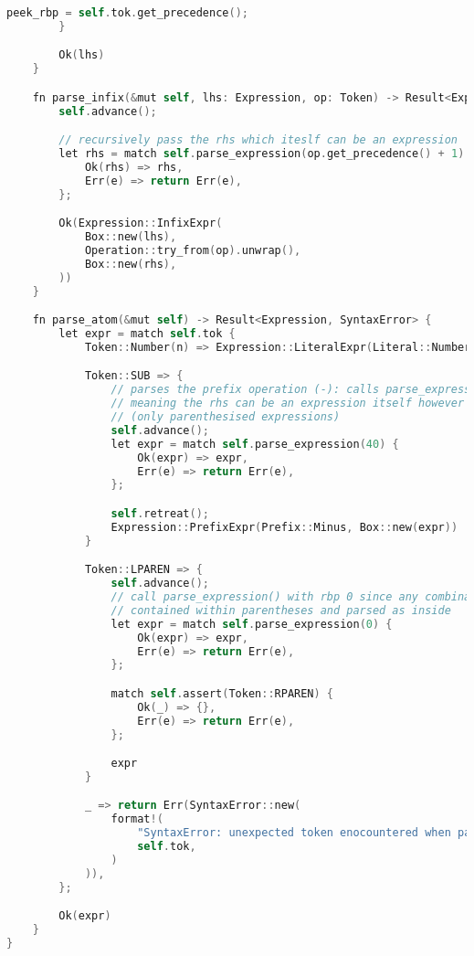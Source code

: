 \begin{lstlisting}[language=C]
            peek_rbp = self.tok.get_precedence();
        }

        Ok(lhs)
    }

    fn parse_infix(&mut self, lhs: Expression, op: Token) -> Result<Expression, SyntaxError> {
        self.advance();

        // recursively pass the rhs which iteslf can be an expression 
        let rhs = match self.parse_expression(op.get_precedence() + 1) {
            Ok(rhs) => rhs,
            Err(e) => return Err(e),
        };

        Ok(Expression::InfixExpr(
            Box::new(lhs),
            Operation::try_from(op).unwrap(),
            Box::new(rhs),
        ))
    }

    fn parse_atom(&mut self) -> Result<Expression, SyntaxError> {
        let expr = match self.tok {
            Token::Number(n) => Expression::LiteralExpr(Literal::Number(n as i32)),

            Token::SUB => {
                // parses the prefix operation (-): calls parse_expression() with rbp 40
                // meaning the rhs can be an expression itself however only one with precedence > 40
                // (only parenthesised expressions)
                self.advance();
                let expr = match self.parse_expression(40) {
                    Ok(expr) => expr,
                    Err(e) => return Err(e),
                };

                self.retreat();
                Expression::PrefixExpr(Prefix::Minus, Box::new(expr))
            }

            Token::LPAREN => {
                self.advance();
                // call parse_expression() with rbp 0 since any combination of operations can be 
                // contained within parentheses and parsed as inside
                let expr = match self.parse_expression(0) {
                    Ok(expr) => expr,
                    Err(e) => return Err(e),
                };

                match self.assert(Token::RPAREN) {
                    Ok(_) => {},
                    Err(e) => return Err(e),
                };

                expr
            }

            _ => return Err(SyntaxError::new(
                format!(
                    "SyntaxError: unexpected token enocountered when parsing infix expression '{:?}'",
                    self.tok,
                )
            )),
        };

        Ok(expr)
    }
}
\end{lstlisting}

